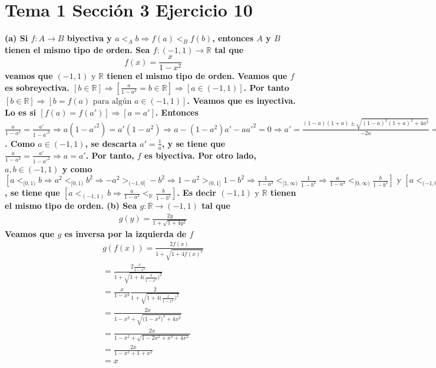 \documentclass{article}
\begin{document}
\section{Tema 1 Sección 3 Ejercicio 10}
\bf (a) \rm Si \(f:A\longrightarrow B\) biyectiva y \(a<_{A} b \Rightarrow f(a)<_{B} f(b)\), entonces \(A\) y \(B\) tienen el mismo tipo de orden. Sea \(f: (-1,1)\longrightarrow \mathbb{R}\) tal que 
\begin{equation}
f(x)=\frac{x}{1-x^2}
\end{equation}
veamos que \( (-1,1)\text{ y } \mathbb{R}\) tienen el mismo tipo de orden. Veamos que \(f\) es sobreyectiva. \([b\in \mathbb{R}] \Rightarrow [\frac{a}{1-a^2}=b \in \mathbb{R}] \Rightarrow [a \in (-1,1)]\). Por tanto \([b\in \mathbb{R}] \Rightarrow [b=f(a) \text{ para algún } a \in (-1,1)]\). Veamos que es inyectiva. Lo es si \([f(a)=f(a')]\Rightarrow[ a=a']\). Entonces \(\frac{a}{1-a^2}=\frac{a'}{1-a'^2}\Rightarrow a(1-a'^2)=a'(1-a^2)\Rightarrow a-(1-a^2)a'-aa'^2=0\Rightarrow a'=\frac{(1-a)(1+a)\pm \sqrt{(1-a)^2(1+a)^2+4a^2}}{-2a} \Rightarrow a'=\frac{(1-a)(1+a)\pm \sqrt{(1-2a^2+a^4)+4a^2}}{-2a}=\frac{(1-a)(1+a)\pm \sqrt{(1+2a^2+a^4)}}{-2a}=\frac{(1-a^2)\pm (1+a^2)}{-2a}\Rightarrow a=a' \text{ o } a'=\frac{1}{a}\). Como \(a\in (-1,1)\), se descarta \(a'=\frac{1}{a}\), y se tiene que \(\frac{a}{1-a^2}=\frac{a'}{1-a'^2}\Rightarrow a=a'\). Por tanto, \(f\) es biyectiva. Por otro lado, \( a,b \in (-1,1) \)  y como \( [a<_{[0,1)}b  \Rightarrow  a^2 <_{[0,1)} b^2 \Rightarrow  -a^2 >_{(-1,0]} -b^2 \Rightarrow  1-a^2 >_{(0,1]} 1-b^2 \Rightarrow  \frac{1}{1-a^2} <_{[1,\infty)} \frac{1}{1-b^2}\Rightarrow  \frac{a}{1-a^2} <_{[0,\infty)} \frac{b}{1-b^2}]\text{ y } [a<_{(-1,0]}b  \Rightarrow  a^2 >_{(-1,0]} b^2 \Rightarrow  -a^2 <_{(-1,0]} -b^2 \Rightarrow  1-a^2 <_{(-1,0]} 1-b^2 \Rightarrow  \frac{1}{1-a^2} >_{[1,\infty)} \frac{1}{1-b^2} \Rightarrow  \frac{a}{1-a^2} <_{(-\infty,0]} \frac{b}{1-b^2}] \), se tiene que  \([a<_{(-1,1)}b \Rightarrow  \frac{a}{1-a^2} <_{\mathbb{R}} \frac{b}{1-b^2}] \). Es decir \( (-1,1)\text{ y } \mathbb{R}\) tienen el mismo tipo de orden. \newline
\bf (b) \rm Sea \(g: \mathbb{R} \longrightarrow (-1,1)\) tal que
\begin{equation}
\begin{aligned}
g(y)=\frac{2y}{1+\sqrt{1+4y^2}}
\end{aligned}
\end{equation}
Veamos que \(g\) es inversa por la izquierda de \(f\)
\begin{equation}
\begin{aligned}
g(f(x))=\frac{2f(x)}{1+\sqrt{1+4f(x)^2}}
\\
=\frac{2\frac{x}{1-x^2}}{1+\sqrt{1+4\big(\frac{x}{1-x^2}\big)^2}}\\
=\frac{x}{1-x^2}\frac{2}{1+\sqrt{1+4\big(\frac{x}{1-x^2}\big)^2}}\\
=\frac{2x}{1-x^2+\sqrt{\big(1-x^2\big)^2+4x^2}}\\
=\frac{2x}{1-x^2+\sqrt{1-2x^2+x^4+4x^2}}\\
=\frac{2x}{1-x^2+1+x^2}\\
=x
\end{aligned}
\end{equation}
\end{document}
